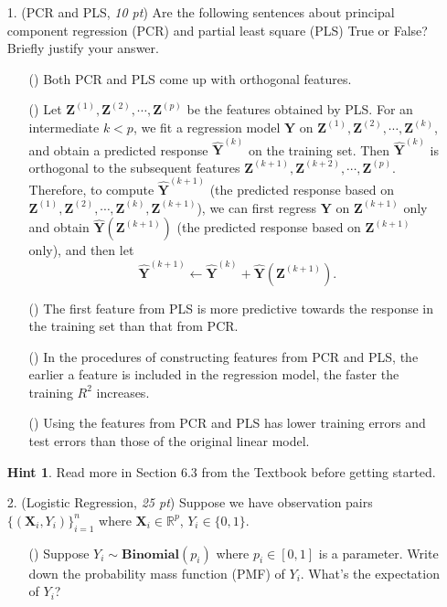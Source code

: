 \documentclass[10pt]{article}
\theoremstyle{definition}
\newtheorem*{hint}{Hint}
\theoremstyle{remark}
\newcommand{\bX}{\bm{X}}
\newcommand{\bY}{\bm{Y}}
\newcommand{\bZ}{\bm{Z}}
\newcommand{\bbR}{\mathbb{R}}
\newcommand{\Bin}{\textbf{Binomial}}
\begin{document}
\begin{itemize}
	\item [1.] (PCR and PLS, \textit{10 pt}) Are the following sentences about principal component regression (PCR) and partial least square (PLS) True or False? Briefly justify your answer.
	\begin{itemize}
		\item [(\romannum{1})] Both PCR and PLS come up with orthogonal features.
		
		\item [(\romannum{2})] Let $ \bZ^{(1)},\bZ^{(2)},\cdots,\bZ^{(p)} $ be the features obtained by PLS. For an intermediate $ k < p $, we fit a regression model $ \bY $ on $ \bZ^{(1)},\bZ^{(2)},\cdots,\bZ^{(k)} $, and obtain a predicted response $ \hat{\bY}^{(k)} $ on the training set. Then $ \hat{\bY}^{(k)} $ is orthogonal to the subsequent features $ \bZ^{(k+1)},\bZ^{(k+2)},\cdots,\bZ^{(p)} $. Therefore, to compute $ \hat{\bY}^{(k+1)} $ (the predicted response based on $ \bZ^{(1)},\bZ^{(2)},\cdots,\bZ^{(k)},\bZ^{(k+1)} $), we can first regress $ \bY $ on $ \bZ^{(k+1)} $ only and obtain $ \hat{\bY}(\bZ^{(k+1)}) $ (the predicted response based on $ \bZ^{(k+1)} $ only), and then let
		\[ \hat{\bY}^{(k+1)} \gets \hat{\bY}^{(k)} + \hat{\bY}(\bZ^{(k+1)}). \]
		
		\item [(\romannum{3})] The first feature from PLS is more predictive towards the response in the training set than that from PCR.
		
		\item [(\romannum{4})] In the procedures of constructing features from PCR and PLS, the earlier a feature is included in the regression model, the faster the training $ R^{2} $ increases.
		
		\item [(\romannum{5})] Using the features from PCR and PLS has lower training errors and test errors than those of the original linear model.
	\end{itemize}
	\begin{hint}
		Read more in Section 6.3 from the Textbook before getting started.
	\end{hint}
	
	\item [2.] (Logistic Regression, \textit{25 pt}) Suppose we have observation pairs $ \{(\bX_{i},Y_{i})\}_{i=1}^{n} $ where $ \bX_{i}\in \bbR^{p} $, $ Y_{i} \in \{ 0,1 \} $.
	\begin{itemize}
		\item [(\romannum{1})] Suppose $ Y_{i} \sim \Bin(p_{i}) $ where $ p_{i} \in [0,1] $ is a parameter. Write down the probability mass function (PMF) of $ Y_{i} $. What's the expectation of $ Y_{i} $?
		

\end{itemize}
\end{itemize}
\end{document}
